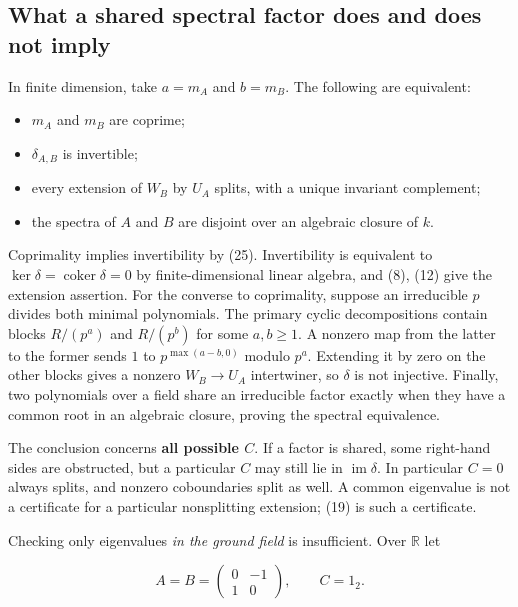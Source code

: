 \documentclass[
  11pt,
]{article}
\providecommand{\tightlist}{%
  \setlength{\itemsep}{0pt}\setlength{\parskip}{0pt}}
\begin{document}
\subsection{What a shared spectral factor does and does not
imply}\label{what-a-shared-spectral-factor-does-and-does-not-imply}

In finite dimension, take \(a=m_A\) and \(b=m_B\). The following are
equivalent:

\begin{itemize}
\tightlist
\item
  \(m_A\) and \(m_B\) are coprime;
\item
  \(\delta_{A,B}\) is invertible;
\item
  every extension of \(W_B\) by \(U_A\) splits, with a unique invariant
  complement;
\item
  the spectra of \(A\) and \(B\) are disjoint over an algebraic closure
  of \(k\).
\end{itemize}

Coprimality implies invertibility by (25). Invertibility is equivalent
to \(\ker\delta=\operatorname{coker}\delta=0\) by finite-dimensional
linear algebra, and (8), (12) give the extension assertion. For the
converse to coprimality, suppose an irreducible \(p\) divides both
minimal polynomials. The primary cyclic decompositions contain blocks
\(R/(p^a)\) and \(R/(p^b)\) for some \(a,b\ge1\). A nonzero map from the
latter to the former sends \(1\) to \(p^{\max(a-b,0)}\) modulo \(p^a\).
Extending it by zero on the other blocks gives a nonzero \(W_B\to U_A\)
intertwiner, so \(\delta\) is not injective. Finally, two polynomials
over a field share an irreducible factor exactly when they have a common
root in an algebraic closure, proving the spectral equivalence.

The conclusion concerns \textbf{all possible \(C\)}. If a factor is
shared, some right-hand sides are obstructed, but a particular \(C\) may
still lie in \(\operatorname{im}\delta\). In particular \(C=0\) always
splits, and nonzero coboundaries split as well. A common eigenvalue is
not a certificate for a particular nonsplitting extension; (19) is such
a certificate.

Checking only eigenvalues \emph{in the ground field} is insufficient.
Over \(\mathbb R\) let

\[A=B=\begin{pmatrix}0&-1\\1&0\end{pmatrix},\qquad C=1_2.\]
\end{document}
